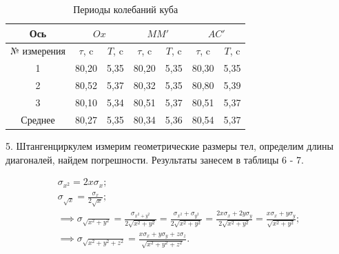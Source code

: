 \documentclass[a4paper, 12pt]{article}
\begin{document}
        \begin{table}
            \centering
            \caption{Периоды колебаний куба}
            \begin{tabular}{|c|cc|cc|cc|}
                \hline
                Ось
                & \multicolumn{2}{c|}{$Ox$}
                & \multicolumn{2}{c|}{$MM'$}
                & \multicolumn{2}{c|}{$AC'$}
                \\
                \hline
                № измерения 
                & \multicolumn{1}{c|}{$\tau$, c} 
                & \multicolumn{1}{c|}{$T$, c} 
                & \multicolumn{1}{c|}{$\tau$, c} 
                & \multicolumn{1}{c|}{$T$, c} 
                & \multicolumn{1}{c|}{$\tau$, c} 
                & \multicolumn{1}{c|}{$T$, c} \\
                \hline
                1
                & \multicolumn{1}{l|}{80,20} & 5,35
                & \multicolumn{1}{l|}{80,20} & 5,35
                & \multicolumn{1}{l|}{80,30} & 5,35
                \\
                \hline
                2
                & \multicolumn{1}{l|}{80,52} & 5,37
                & \multicolumn{1}{l|}{80,32} & 5,35
                & \multicolumn{1}{l|}{80,80} & 5,39
                \\
                \hline
                3
                & \multicolumn{1}{l|}{80,10} & 5,34
                & \multicolumn{1}{l|}{80,51} & 5,37
                & \multicolumn{1}{l|}{80,51} & 5,37
                \\
                \hline
                Среднее
                & \multicolumn{1}{l|}{80,27} & 5,35
                & \multicolumn{1}{l|}{80,34} & 5,36
                & \multicolumn{1}{l|}{80,54} & 5,37
                \\
                \hline
            \end{tabular}
        \end{table}

        5. Штангенциркулем измерим геометрические размеры тел, определим длины диагоналей, найдем погрешности. Результаты занесем в таблицы 6 - 7.

        \vspace{-8mm}
        \begin{equation*}
            \begin{aligned}
                 \sigma_{x^2} = 2x\sigma_{x};\\ 
                 \sigma_{\sqrt{x}} = \frac{\sigma_{x}}{2\sqrt{x}};\\
                 \implies 
                 \sigma_{\sqrt{x^2+y^2}} = 
                 \frac{\sigma_{x^2+y^2}}{2\sqrt{x^2+y^2}} = 
                 \frac{\sigma_{x^2}+\sigma_{y^2}}{2\sqrt{x^2+y^2}} =
                 \frac{2x\sigma_{x}+2y\sigma_{y}}{2\sqrt{x^2+y^2}} =
                 \frac{x\sigma_{x}+y\sigma_{y}}{\sqrt{x^2+y^2}};\\
                 \implies \sigma_{\sqrt{x^2+y^2+z^2}} =
                 \frac{x\sigma_{x}+y\sigma_{y}+z\sigma_{z}}{\sqrt{x^2+y^2+z^2}}.
            \end{aligned}
        \end{equation*}
\end{document}
